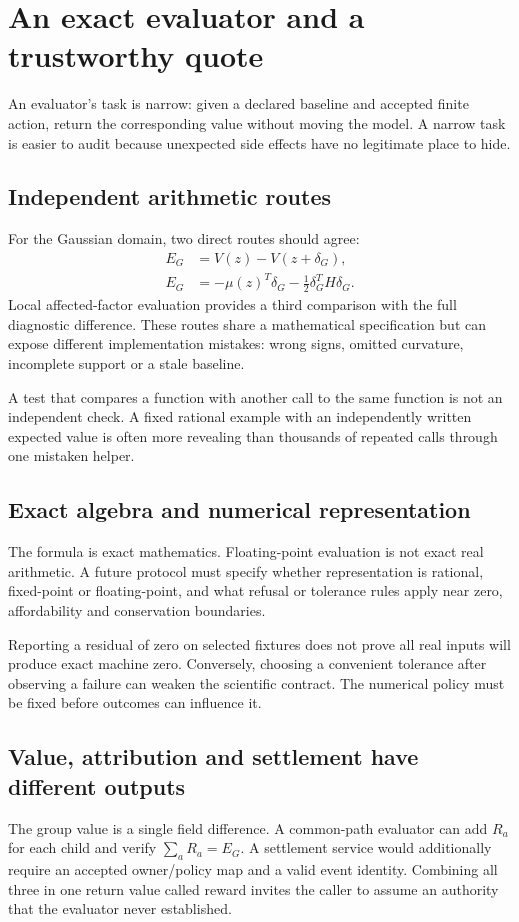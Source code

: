 \chapter{An exact evaluator and a trustworthy quote}\label{ch:evaluator}
An evaluator's task is narrow: given a declared baseline and accepted finite
action, return the corresponding value without moving the model. A narrow
task is easier to audit because unexpected side effects have no legitimate
place to hide.

\section{Independent arithmetic routes}
For the Gaussian domain, two direct routes should agree:
\begin{align}
 E_G&=V(z)-V(z+\delta_G),\\
 E_G&=-\mu(z)^T\delta_G-\tfrac12\delta_G^TH\delta_G.
\end{align}
Local affected-factor evaluation provides a third comparison with the full
diagnostic difference. These routes share a mathematical specification but
can expose different implementation mistakes: wrong signs, omitted curvature,
incomplete support or a stale baseline.

A test that compares a function with another call to the same function is
not an independent check. A fixed rational example with an independently
written expected value is often more revealing than thousands of repeated
calls through one mistaken helper.

\section{Exact algebra and numerical representation}
The formula is exact mathematics. Floating-point evaluation is not exact
real arithmetic. A future protocol must specify whether representation is
rational, fixed-point or floating-point, and what refusal or tolerance rules
apply near zero, affordability and conservation boundaries.

Reporting a residual of zero on selected fixtures does not prove all real
inputs will produce exact machine zero. Conversely, choosing a convenient
tolerance after observing a failure can weaken the scientific contract.
The numerical policy must be fixed before outcomes can influence it.

\section{Value, attribution and settlement have different outputs}
The group value is a single field difference. A common-path evaluator can
add $R_a$ for each child and verify $\sum_aR_a=E_G$. A settlement service
would additionally require an accepted owner/policy map and a valid event
identity. Combining all three in one return value called reward invites
the caller to assume an authority that the evaluator never established.

